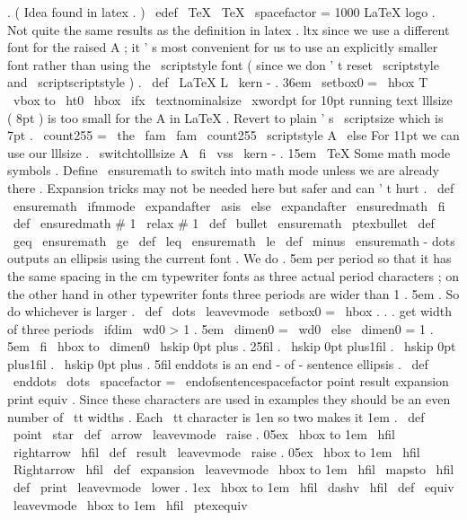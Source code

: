 {{{{.
(
Idea
found
in
latex
.
)
%
\
edef
\
TeX
{
\
TeX
\
spacefactor
=
1000
}
%
LaTeX
{
}
logo
.
Not
quite
the
same
results
as
the
definition
in
%
latex
.
ltx
since
we
use
a
different
font
for
the
raised
A
;
it
'
s
most
%
convenient
for
us
to
use
an
explicitly
smaller
font
rather
than
using
%
the
\
scriptstyle
font
(
since
we
don
'
t
reset
\
scriptstyle
and
%
\
scriptscriptstyle
)
.
%
\
def
\
LaTeX
{
%
L
\
kern
-
.
36em
{
\
setbox0
=
\
hbox
{
T
}
%
\
vbox
to
\
ht0
{
\
hbox
{
%
\
ifx
\
textnominalsize
\
xwordpt
%
for
10pt
running
text
lllsize
(
8pt
)
is
too
small
for
the
A
in
LaTeX
.
%
Revert
to
plain
'
s
\
scriptsize
which
is
7pt
.
\
count255
=
\
the
\
fam
\
fam
\
count255
\
scriptstyle
A
%
\
else
%
For
11pt
we
can
use
our
lllsize
.
\
switchtolllsize
A
%
\
fi
}
%
\
vss
}
}
%
\
kern
-
.
15em
\
TeX
}
%
Some
math
mode
symbols
.
Define
\
ensuremath
to
switch
into
math
mode
%
unless
we
are
already
there
.
Expansion
tricks
may
not
be
needed
here
%
but
safer
and
can
'
t
hurt
.
\
def
\
ensuremath
{
\
ifmmode
\
expandafter
\
asis
\
else
\
expandafter
\
ensuredmath
\
fi
}
\
def
\
ensuredmath
#
1
{
\
relax
#
1
}
%
\
def
\
bullet
{
\
ensuremath
\
ptexbullet
}
\
def
\
geq
{
\
ensuremath
\
ge
}
\
def
\
leq
{
\
ensuremath
\
le
}
\
def
\
minus
{
\
ensuremath
-
}
%
dots
{
}
outputs
an
ellipsis
using
the
current
font
.
%
We
do
.
5em
per
period
so
that
it
has
the
same
spacing
in
the
cm
%
typewriter
fonts
as
three
actual
period
characters
;
on
the
other
hand
%
in
other
typewriter
fonts
three
periods
are
wider
than
1
.
5em
.
So
do
%
whichever
is
larger
.
%
\
def
\
dots
{
%
\
leavevmode
\
setbox0
=
\
hbox
{
.
.
.
}
%
get
width
of
three
periods
\
ifdim
\
wd0
>
1
.
5em
\
dimen0
=
\
wd0
\
else
\
dimen0
=
1
.
5em
\
fi
\
hbox
to
\
dimen0
{
%
\
hskip
0pt
plus
.
25fil
.
\
hskip
0pt
plus1fil
.
\
hskip
0pt
plus1fil
.
\
hskip
0pt
plus
.
5fil
}
%
}
%
enddots
{
}
is
an
end
-
of
-
sentence
ellipsis
.
%
\
def
\
enddots
{
%
\
dots
\
spacefactor
=
\
endofsentencespacefactor
}
%
point
{
}
result
{
}
expansion
{
}
print
{
}
equiv
{
}
.
%
%
Since
these
characters
are
used
in
examples
they
should
be
an
even
number
of
%
\
tt
widths
.
Each
\
tt
character
is
1en
so
two
makes
it
1em
.
%
\
def
\
point
{
\
star
}
\
def
\
arrow
{
\
leavevmode
\
raise
.
05ex
\
hbox
to
1em
{
\
hfil
\
rightarrow
\
hfil
}
}
\
def
\
result
{
\
leavevmode
\
raise
.
05ex
\
hbox
to
1em
{
\
hfil
\
Rightarrow
\
hfil
}
}
\
def
\
expansion
{
\
leavevmode
\
hbox
to
1em
{
\
hfil
\
mapsto
\
hfil
}
}
\
def
\
print
{
\
leavevmode
\
lower
.
1ex
\
hbox
to
1em
{
\
hfil
\
dashv
\
hfil
}
}
\
def
\
equiv
{
\
leavevmode
\
hbox
to
1em
{
\
hfil
\
ptexequiv
}}}}}}
